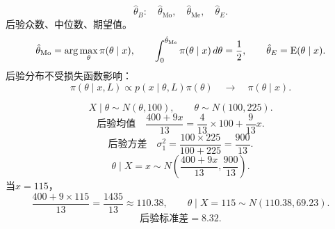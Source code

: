 \[
\hat\theta_B:\quad\hat\theta_{\mathrm{Mo}},\quad
\hat\theta_{\mathrm{Me}},\quad\hat\theta_E.
\]
后验众数、中位数、期望值。
\[
\hat\theta_{\mathrm{Mo}}=\arg\max_\theta\pi(\theta\mid x),
\qquad
\int_0^{\hat\theta_{\mathrm{Me}}}\pi(\theta\mid x)\,d\theta=\frac12,
\qquad
\hat\theta_E=\operatorname{E}(\theta\mid x).
\]
后验分布不受损失函数影响：
\[
\pi(\theta\mid x,L)\propto p(x\mid\theta,L)\pi(\theta)
\quad\longrightarrow\quad\pi(\theta\mid x).
\]

\[
X\mid\theta\sim N(\theta,100),\qquad\theta\sim N(100,225).
\]
\[
\text{后验均值}\quad
\frac{400+9x}{13}=\frac4{13}\times100+\frac9{13}x.
\]
\[
\text{后验方差}\quad\sigma_1^2
=\frac{100\times225}{100+225}=\frac{900}{13}.
\]
\[
\theta\mid X=x\sim N\left(\frac{400+9x}{13},\frac{900}{13}\right).
\]
当$x=115$，
\[
\frac{400+9\times115}{13}=\frac{1435}{13}\approx110.38,
\qquad\theta\mid X=115\sim N(110.38,69.23).
\]
\[
\text{后验标准差}=8.32.
\]

